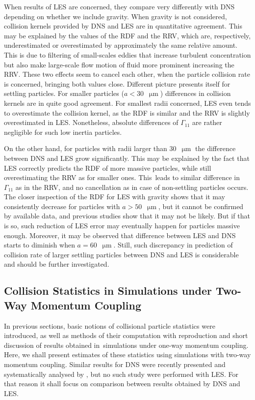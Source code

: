 \documentclass{pracamgren}
\begin{document}
When results of LES are concerned, they compare very differently with DNS depending on whether we include gravity.
When gravity is not considered, collision kernels provided by DNS and LES are in quantitative agreement.
This may be explained by the values of the RDF and the RRV, which are, respectively, underestimated or overestimated by approximately the same relative amount.
This is due to filtering of small-scales eddies that increase turbulent concentration but also make large-scale flow motion of fluid more prominent increasing the RRV.
These two effects seem to cancel each other, when the particle collision rate is concerned, bringing both values close.
Different picture presents itself for settling particles.
For smaller particles ($a < 30$~$\upmu\text{m}$) differences in collision kernels are in quite good agreement.
For smallest radii concerned, LES even tends to overestimate the collision kernel, as the RDF is similar and the RRV is slightly overestimated in LES.
Nonetheless, absolute differences of $\Gamma_{11}$ are rather negligible for such low inertia particles.

On the other hand, for particles with radii larger than $30$~$\upmu\text{m}$ the difference between DNS and LES grow significantly.
This may be explained by the fact that LES correctly predicts the RDF of more massive particles, while still overestimating the RRV as for smaller ones.
This~leads to similar difference in $\Gamma_{11}$ as in the RRV, and no cancellation as in case of non-settling particles occurs.
The closer inspection of the RDF for LES with gravity shows that it may consistently decrease for particles with $a > 50$~$\upmu\text{m}$, but it cannot be confirmed by available data, and previous studies \parencite{Rosa2017} show that it may not be likely.
But if that is so, such reduction of LES error may eventually happen for particles massive enough.
Moreover, it may be observed that difference between LES and DNS starts to diminish when $a = 60$~$\upmu\text{m}$.
Still, such discrepancy in prediction of collision rate of larger settling particles between DNS and LES is considerable and should be further investigated.


\subsection{Collision Statistics in Simulations under Two-Way Momentum Coupling}
\label{ssc:ch2.coll.twc}

In previous sections, basic notions of collisional particle statistics were introduced, as well as methods of their computation with reproduction and short discussion of results obtained in~simulations under one-way momentum coupling.
Here, we shall present estimates of these statistics using simulations with two-way momentum coupling.
Similar results for DNS were recently presented and systematically analysed by \textcite{Rosa2020,Rosa2022}, but no such study were performed with LES.
For that reason it shall focus on comparison between results obtained by DNS and LES.
\end{document}
